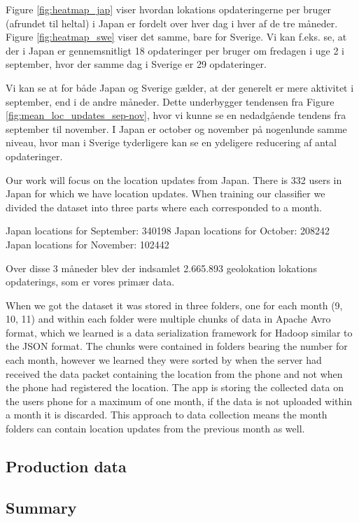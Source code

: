  Figure \ref{fig:heatmap_jap} viser hvordan lokations opdateringerne per bruger (afrundet til heltal) i Japan er fordelt over hver dag i hver af de tre måneder. Figure \ref{fig:heatmap_swe} viser det samme, bare for Sverige. 
 Vi kan f.eks. se, at der i Japan er gennemsnitligt 18 opdateringer per bruger om fredagen i uge 2 i september, hvor der samme dag i Sverige er 29 opdateringer. 

 Vi kan se at for både Japan og Sverige gælder, at der generelt er mere aktivitet i september, end i de andre måneder. Dette underbygger tendensen fra Figure \ref{fig:mean_loc_updates_sep-nov}, hvor vi kunne se en nedadgående tendens fra september til november. I Japan er october og november på nogenlunde samme niveau, hvor man i Sverige tyderligere kan se en ydeligere reducering af antal opdateringer. 

 
\newpage


Our work will focus on the location updates from Japan. There is 332 users in Japan for which we have location updates.
When training our classifier we divided the dataset into three parts where each corresponded to a month.

Japan locations for September: 340198
Japan locations for October: 208242
Japan locations for November: 102442



Over disse 3 måneder blev der indsamlet 2.665.893 geolokation lokations opdaterings, som er vores primær data. 

When we got the dataset it was stored in three folders, one for each month (9, 10, 11) and within each folder were multiple chunks of data in Apache Avro format\cite{apacheavro}, which we learned is a data serialization framework for Hadoop similar to the JSON format. The chunks were contained in folders bearing the number for each month, however we learned they were sorted by when the server had received the data packet containing the location from the phone and not when the phone had registered the location. The app is storing the collected data on the users phone for a maximum of one month, if the data is not uploaded within a month it is discarded. This approach to data collection means the month folders can contain location updates from the previous month as well.


\subsection{Production data}
\begin{landscape}

\section{Summary}
\end{landscape}